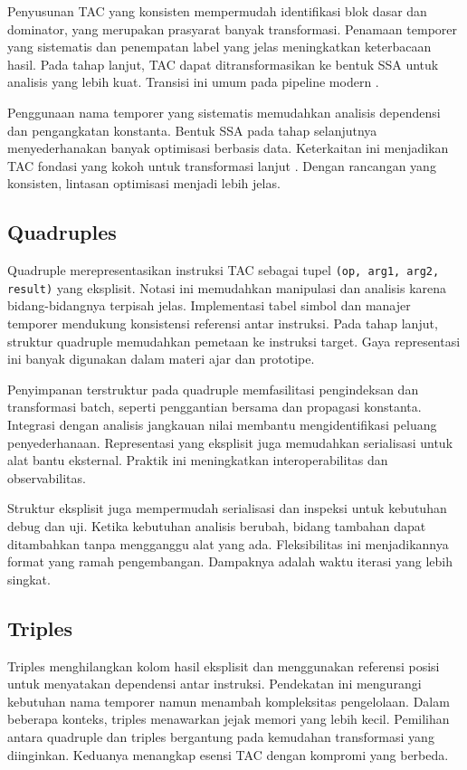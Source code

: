 \documentclass[../main.tex]{subfiles}
\begin{document}
Penyusunan TAC yang konsisten mempermudah identifikasi blok dasar dan dominator, yang merupakan prasyarat banyak transformasi. Penamaan temporer yang sistematis dan penempatan label yang jelas meningkatkan keterbacaan hasil. Pada tahap lanjut, TAC dapat ditransformasikan ke bentuk SSA untuk analisis yang lebih kuat. Transisi ini umum pada pipeline modern \citep{LLVMOverview}.

Penggunaan nama temporer yang sistematis memudahkan analisis dependensi dan pengangkatan konstanta. Bentuk SSA pada tahap selanjutnya menyederhanakan banyak optimisasi berbasis data. Keterkaitan ini menjadikan TAC fondasi yang kokoh untuk transformasi lanjut \citep{WikiTAC}. Dengan rancangan yang konsisten, lintasan optimisasi menjadi lebih jelas.

\subsection{Quadruples}
Quadruple merepresentasikan instruksi TAC sebagai tupel \texttt{(op, arg1, arg2, result)} yang eksplisit. Notasi ini memudahkan manipulasi dan analisis karena bidang-bidangnya terpisah jelas. Implementasi tabel simbol dan manajer temporer mendukung konsistensi referensi antar instruksi. Pada tahap lanjut, struktur quadruple memudahkan pemetaan ke instruksi target. Gaya representasi ini banyak digunakan dalam materi ajar dan prototipe.

Penyimpanan terstruktur pada quadruple memfasilitasi pengindeksan dan transformasi batch, seperti penggantian bersama dan propagasi konstanta. Integrasi dengan analisis jangkauan nilai membantu mengidentifikasi peluang penyederhanaan. Representasi yang eksplisit juga memudahkan serialisasi untuk alat bantu eksternal. Praktik ini meningkatkan interoperabilitas dan observabilitas.

Struktur eksplisit juga mempermudah serialisasi dan inspeksi untuk kebutuhan debug dan uji. Ketika kebutuhan analisis berubah, bidang tambahan dapat ditambahkan tanpa mengganggu alat yang ada. Fleksibilitas ini menjadikannya format yang ramah pengembangan. Dampaknya adalah waktu iterasi yang lebih singkat.

\subsection{Triples}
Triples menghilangkan kolom hasil eksplisit dan menggunakan referensi posisi untuk menyatakan dependensi antar instruksi. Pendekatan ini mengurangi kebutuhan nama temporer namun menambah kompleksitas pengelolaan. Dalam beberapa konteks, triples menawarkan jejak memori yang lebih kecil. Pemilihan antara quadruple dan triples bergantung pada kemudahan transformasi yang diinginkan. Keduanya menangkap esensi TAC dengan kompromi yang berbeda.
\end{document}
